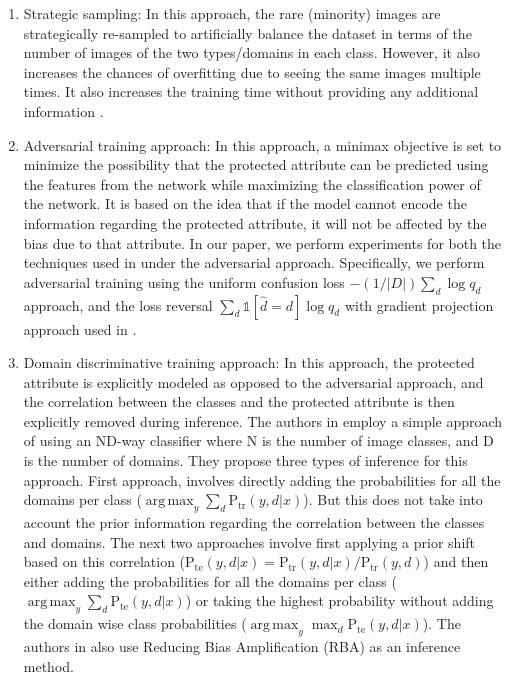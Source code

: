 \documentclass[10pt,twocolumn,letterpaper]{article}
\DeclareMathOperator*{\argmax}{arg\,max}
\newcommand{\ptr}{\mathrm{P}_{\mathrm{tr}}}
\newcommand{\pte}{\mathrm{P}_{\mathrm{te}}}
\begin{document}
\begin{enumerate}
    \item Strategic sampling: In this approach, the rare (minority) images are strategically re-sampled to artificially balance the dataset in terms of the number of images of the two types/domains in each class. However, it also increases the chances of overfitting due to seeing the same images multiple times. It also increases the training time without providing any additional information \cite{wang2020towards}.
    
    \item Adversarial training approach: In this approach, a minimax objective is set to minimize the possibility that the protected attribute can be predicted using the features from the network while maximizing the classification power of the network. It is based on the idea that if the model cannot encode the information regarding the protected attribute, it will not be affected by the bias due to that attribute. In our paper, we perform experiments for both the techniques used in \cite{wang2020towards} under the adversarial approach. Specifically, we perform adversarial training using the uniform confusion loss $-(1/|D|) \sum_{d} \log q_d $ approach, and the loss reversal $ \sum_{d} \mathds{1}[\widehat{d} = d] \log q_d $ with gradient projection approach used in \cite{wang2020towards}.
    
    \item Domain discriminative training approach: In this approach, the protected attribute is explicitly modeled as opposed to the adversarial approach, and the correlation between the classes and the protected attribute is then explicitly removed during inference. The authors in \cite{wang2020towards} employ a simple approach of using an ND-way classifier where N is the number of image classes, and D is the number of domains. They propose three types of inference for this approach. First approach, involves directly adding the probabilities for all the domains per class ($\argmax_y \sum_d \ptr(y,d|x)$). But this does not take into account the prior information regarding the correlation between the classes and domains. The next two approaches involve first applying a prior shift based on this correlation ($\pte(y,d|x) = \ptr(y,d|x)/\ptr(y,d)$) and then either adding the probabilities for all the domains per class ($\argmax_y \sum_d \pte(y,d|x)$) or taking the highest probability without adding the domain wise class probabilities ($\argmax_{y} \max_d \pte(y,d|x)$). The authors in \cite{wang2020towards} also use Reducing Bias Amplification (RBA) \cite{zhao_men_2017} as an inference method. 
    

\end{enumerate}
\end{document}
